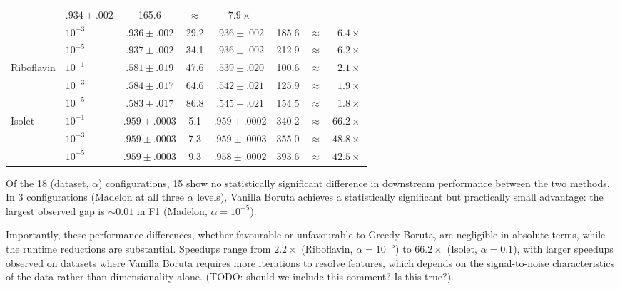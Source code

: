 \documentclass[runningheads]{llncs}
\begin{document}
\begin{table}[H]
\begin{tabular}{ll cc cc c r}
               & $.934 \pm .002$ & 165.6
               & $\approx$ & $7.9\times$ \\
  & $10^{-3}$  & $.936 \pm .002$ & 29.2
               & $.936 \pm .002$ & 185.6
               & $\approx$ & $6.4\times$ \\
  & $10^{-5}$  & $.937 \pm .002$ & 34.1
               & $.936 \pm .002$ & 212.9
               & $\approx$ & $6.2\times$ \\
\midrule
\multirow{3}{*}{Riboflavin}
  & $10^{-1}$  & $.581 \pm .019$ & 47.6
               & $.539 \pm .020$ & 100.6
               & $\approx$ & $2.1\times$ \\
  & $10^{-3}$  & $.584 \pm .017$ & 64.6
               & $.542 \pm .021$ & 125.9
               & $\approx$ & $1.9\times$ \\
  & $10^{-5}$  & $.583 \pm .017$ & 86.8
               & $.545 \pm .021$ & 154.5
               & $\approx$ & $1.8\times$ \\
\midrule
\multirow{3}{*}{Isolet}
  & $10^{-1}$  & $.959 \pm .0003$ & 5.1
               & $.959 \pm .0002$ & 340.2
               & $\approx$ & $66.2\times$ \\
  & $10^{-3}$  & $.959 \pm .0003$ & 7.3
               & $.959 \pm .0003$ & 355.0
               & $\approx$ & $48.8\times$ \\
  & $10^{-5}$  & $.959 \pm .0003$ & 9.3
               & $.958 \pm .0002$ & 393.6
               & $\approx$ & $42.5\times$ \\
\bottomrule
\end{tabular}
\end{table}
 
Of the 18 (dataset, $\alpha$) configurations, 15 show no statistically significant difference in downstream performance between the two methods. In 3 configurations (Madelon at all three $\alpha$ levels), Vanilla Boruta achieves a statistically significant but practically small advantage: the largest observed gap is ${\sim}0.01$ in F1 (Madelon, $\alpha = 10^{-5}$).

Importantly, these performance differences, whether favourable or unfavourable to Greedy Boruta, are negligible in absolute terms, while the runtime reductions are substantial. Speedups range from $2.2\times$ (Riboflavin, $\alpha = 10^{-5}$) to $66.2\times$ (Isolet, $\alpha = 0.1$), 
with larger speedups observed on datasets where Vanilla Boruta requires more iterations to resolve features, which depends on the signal-to-noise characteristics of the data rather than dimensionality alone. (TODO: should we include this comment? Is this true?). 
\end{document}
